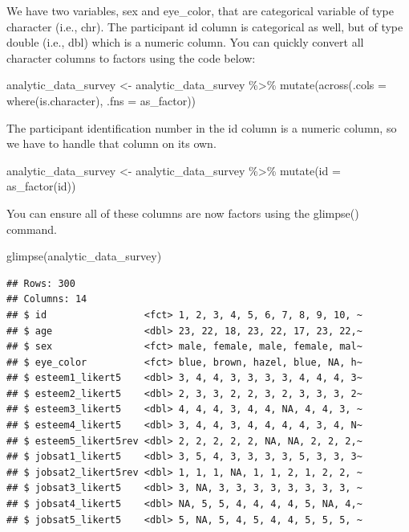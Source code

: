 \documentclass[
]{krantz}
\makeatletter
\newenvironment{Shaded}{\begin{snugshade}}{\end{snugshade}}
\newcommand{\AttributeTok}[1]{\textcolor[rgb]{0.61,0.61,0.61}{#1}}
\newcommand{\FunctionTok}[1]{\textcolor[rgb]{0,0,0}{#1}}
\newcommand{\NormalTok}[1]{#1}
\newcommand{\OtherTok}[1]{\textcolor[rgb]{0.37,0.37,0.37}{#1}}
\newcommand{\SpecialCharTok}[1]{\textcolor[rgb]{0,0,0}{#1}}
\newenvironment{kframe}{%
\medskip{}
\setlength{\fboxsep}{.8em}
 \def\at@end@of@kframe{}%
 \ifinner\ifhmode%
  \def\at@end@of@kframe{\end{minipage}}%
  \begin{minipage}{\columnwidth}%
 \fi\fi%
 \def\FrameCommand##1{\hskip\@totalleftmargin \hskip-\fboxsep
 \colorbox{shadecolor}{##1}\hskip-\fboxsep
     \hskip-\linewidth \hskip-\@totalleftmargin \hskip\columnwidth}%
 \MakeFramed {\advance\hsize-\width
   \@totalleftmargin\z@ \linewidth\hsize
   \@setminipage}}%
 {\par\unskip\endMakeFramed%
 \at@end@of@kframe}
\renewenvironment{Shaded}{\begin{kframe}}{\end{kframe}}
\makeatother
\begin{document}
We have two variables, sex and eye\_color, that are categorical variable of type character (i.e., chr). The participant id column is categorical as well, but of type double (i.e., dbl) which is a numeric column. You can quickly convert all character columns to factors using the code below:

\begin{Shaded}
\begin{Highlighting}[]
\NormalTok{analytic\_data\_survey }\OtherTok{\textless{}{-}}\NormalTok{ analytic\_data\_survey }\SpecialCharTok{\%\textgreater{}\%}
  \FunctionTok{mutate}\NormalTok{(}\FunctionTok{across}\NormalTok{(}\AttributeTok{.cols =} \FunctionTok{where}\NormalTok{(is.character),}
                \AttributeTok{.fns =}\NormalTok{ as\_factor))}
\end{Highlighting}
\end{Shaded}

The participant identification number in the id column is a numeric column, so we have to handle that column on its own.

\begin{Shaded}
\begin{Highlighting}[]
\NormalTok{analytic\_data\_survey }\OtherTok{\textless{}{-}}\NormalTok{ analytic\_data\_survey }\SpecialCharTok{\%\textgreater{}\%}
  \FunctionTok{mutate}\NormalTok{(}\AttributeTok{id =} \FunctionTok{as\_factor}\NormalTok{(id))}
\end{Highlighting}
\end{Shaded}

You can ensure all of these columns are now factors using the glimpse() command.

\begin{Shaded}
\begin{Highlighting}[]
\FunctionTok{glimpse}\NormalTok{(analytic\_data\_survey)}
\end{Highlighting}
\end{Shaded}

\begin{verbatim}
## Rows: 300
## Columns: 14
## $ id                 <fct> 1, 2, 3, 4, 5, 6, 7, 8, 9, 10, ~
## $ age                <dbl> 23, 22, 18, 23, 22, 17, 23, 22,~
## $ sex                <fct> male, female, male, female, mal~
## $ eye_color          <fct> blue, brown, hazel, blue, NA, h~
## $ esteem1_likert5    <dbl> 3, 4, 4, 3, 3, 3, 3, 4, 4, 4, 3~
## $ esteem2_likert5    <dbl> 2, 3, 3, 2, 2, 3, 2, 3, 3, 3, 2~
## $ esteem3_likert5    <dbl> 4, 4, 4, 3, 4, 4, NA, 4, 4, 3, ~
## $ esteem4_likert5    <dbl> 3, 4, 4, 3, 4, 4, 4, 4, 3, 4, N~
## $ esteem5_likert5rev <dbl> 2, 2, 2, 2, 2, NA, NA, 2, 2, 2,~
## $ jobsat1_likert5    <dbl> 3, 5, 4, 3, 3, 3, 3, 5, 3, 3, 3~
## $ jobsat2_likert5rev <dbl> 1, 1, 1, NA, 1, 1, 2, 1, 2, 2, ~
## $ jobsat3_likert5    <dbl> 3, NA, 3, 3, 3, 3, 3, 3, 3, 3, ~
## $ jobsat4_likert5    <dbl> NA, 5, 5, 4, 4, 4, 4, 5, NA, 4,~
## $ jobsat5_likert5    <dbl> 5, NA, 5, 4, 5, 4, 4, 5, 5, 5, ~
\end{verbatim}
\end{document}
